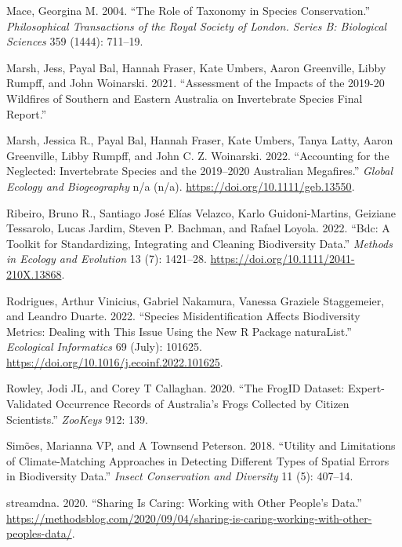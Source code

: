 \documentclass[
  letterpaper,
  DIV=11,
  numbers=noendperiod,
  oneside]{scrreprt}
\newlength{\cslhangindent}
\newlength{\cslentryspacingunit} %
\newenvironment{CSLReferences}[2] %
 {%
  \setlength{\parindent}{0pt}
  \ifodd #1
  \let\oldpar\par
  \def\par{\hangindent=\cslhangindent\oldpar}
  \fi
  \setlength{\parskip}{#2\cslentryspacingunit}
 }%
 {}
\begin{document}
\begin{CSLReferences}{1}{0}
\leavevmode{}%
Mace, Georgina M. 2004. {``The Role of Taxonomy in Species
Conservation.''} \emph{Philosophical Transactions of the Royal Society
of London. Series B: Biological Sciences} 359 (1444): 711--19.

\leavevmode{}%
Marsh, Jess, Payal Bal, Hannah Fraser, Kate Umbers, Aaron Greenville,
Libby Rumpff, and John Woinarski. 2021. {``Assessment of the Impacts of
the 2019-20 Wildfires of Southern and Eastern Australia on Invertebrate
Species Final Report.''}

\leavevmode{}%
Marsh, Jessica R., Payal Bal, Hannah Fraser, Kate Umbers, Tanya Latty,
Aaron Greenville, Libby Rumpff, and John C. Z. Woinarski. 2022.
{``Accounting for the Neglected: {Invertebrate} Species and the
2019--2020 {Australian} Megafires.''} \emph{Global Ecology and
Biogeography} n/a (n/a). \url{https://doi.org/10.1111/geb.13550}.

\leavevmode{}%
Ribeiro, Bruno R., Santiago José Elías Velazco, Karlo Guidoni-Martins,
Geiziane Tessarolo, Lucas Jardim, Steven P. Bachman, and Rafael Loyola.
2022. {``Bdc: {A} Toolkit for Standardizing, Integrating and Cleaning
Biodiversity Data.''} \emph{Methods in Ecology and Evolution} 13 (7):
1421--28. \url{https://doi.org/10.1111/2041-210X.13868}.

\leavevmode{}%
Rodrigues, Arthur Vinicius, Gabriel Nakamura, Vanessa Graziele
Staggemeier, and Leandro Duarte. 2022. {``Species Misidentification
Affects Biodiversity Metrics: {Dealing} with This Issue Using the New
{R} Package {naturaList}.''} \emph{Ecological Informatics} 69 (July):
101625. \url{https://doi.org/10.1016/j.ecoinf.2022.101625}.

\leavevmode{}%
Rowley, Jodi JL, and Corey T Callaghan. 2020. {``The FrogID Dataset:
Expert-Validated Occurrence Records of Australia's Frogs Collected by
Citizen Scientists.''} \emph{ZooKeys} 912: 139.

\leavevmode{}%
Simões, Marianna VP, and A Townsend Peterson. 2018. {``Utility and
Limitations of Climate-Matching Approaches in Detecting Different Types
of Spatial Errors in Biodiversity Data.''} \emph{Insect Conservation and
Diversity} 11 (5): 407--14.

\leavevmode{}%
streamdna. 2020. {``Sharing Is {Caring}: {Working} with {Other} People's
{Data}.''}
\url{https://methodsblog.com/2020/09/04/sharing-is-caring-working-with-other-peoples-data/}.


\end{CSLReferences}
\end{document}
